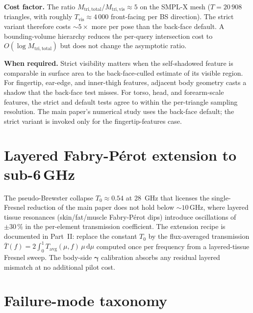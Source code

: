 \documentclass[10pt,journal,twocolumn]{IEEEtran}
\newcommand{\gammab}{\bm{\gamma}}
\newcommand{\Tepskin}{T_{0}}
\newcommand{\diff}{\mathrm{d}}
\theoremstyle{plain}
\theoremstyle{definition}
\begin{document}
\textbf{Cost factor.} The ratio
$M_\mathrm{tri,total} / M_\mathrm{tri,vis} \approx 5$ on the SMPL-X
mesh ($T = 20\,908$ triangles, with roughly $T_\mathrm{vis}
\approx 4\,000$ front-facing per BS direction). The strict variant
therefore costs $\sim\!5\times$ more per pose than the back-face
default. A bounding-volume hierarchy reduces the per-query
intersection cost to $O(\log M_\mathrm{tri,total})$ but does not
change the asymptotic ratio.

\textbf{When required.} Strict visibility matters when the
self-shadowed feature is comparable in surface area to the
back-face-culled estimate of its visible region. For fingertip,
ear-edge, and inner-thigh features, adjacent body geometry casts a
shadow that the back-face test misses. For torso, head, and
forearm-scale features, the strict and default tests agree to within
the per-triangle sampling resolution. The main paper's numerical
study uses the back-face default; the strict variant is invoked
only for the fingertip-features case.

\section{Layered Fabry-Pérot extension to sub-6\,GHz}\label{si:fp}

The pseudo-Brewster collapse $\Tepskin \approx 0.54$ at 28~GHz that
licenses the single-Fresnel reduction of the main paper does not
hold below $\sim 10\,$GHz, where layered tissue resonances
(skin/fat/muscle Fabry-Pérot dips) introduce oscillations of
$\pm 30\,\%$ in the per-element transmission coefficient. The
extension recipe is documented in \cite{WydaegheMonograph} Part~II:
replace the constant $\Tepskin$ by the flux-averaged transmission
$\bar{T}(f) = 2\int_0^1 T_\mathrm{avg}(\mu, f)\,\mu\,\diff\mu$
computed once per frequency from a layered-tissue Fresnel sweep.
The body-side $\gammab$ calibration absorbs any residual layered
mismatch at no additional pilot cost.

\section{Failure-mode taxonomy}\label{si:failure-modes}
\end{document}
